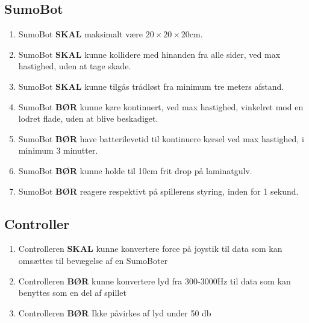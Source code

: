 \subsection{SumoBot}
\begin{enumerate}
    \item SumoBot \textbf{SKAL} maksimalt være $20 \times 20 \times 20$cm.
    \item SumoBot \textbf{SKAL} kunne kollidere med hinanden fra alle sider, ved max hastighed, uden at tage skade.
    \item SumoBot \textbf{SKAL} kunne tilgås trådløst fra minimum tre meters afstand.
    \item SumoBot \textbf {BØR} kunne køre kontinuert, ved max hastighed, vinkelret mod en lodret flade, uden at blive beskadiget.
    \item SumoBot \textbf{BØR} have batterilevetid til kontinuere kørsel ved max hastighed, i minimum 3 minutter.
    \item SumoBot \textbf{BØR} kunne holde til 10cm frit drop på laminatgulv.
    \item SumoBot \textbf{BØR} reagere respektivt på spillerens styring, inden for 1 sekund.
\end{enumerate}

\subsection{Controller}
\begin{enumerate}
    \item Controlleren \textbf{SKAL} kunne konvertere force på joystik til data som kan omsættes til bevægelse af en SumoBoter
    \item Controlleren \textbf{BØR} kunne konvertere lyd fra 300-3000Hz til data som kan benyttes som en del af spillet
    \item Controlleren \textbf{BØR} Ikke påvirkes af lyd under 50 db
    
\end{enumerate}